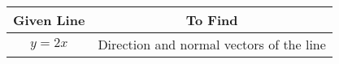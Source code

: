 \begin{tabular}[12pt]{ |c| c| }
    \hline
    \textbf{Given Line} & \textbf{To Find} \\ 
    \hline 
    $y=2x$ &  Direction and normal vectors of the line\\
    \hline   
    \end{tabular}
